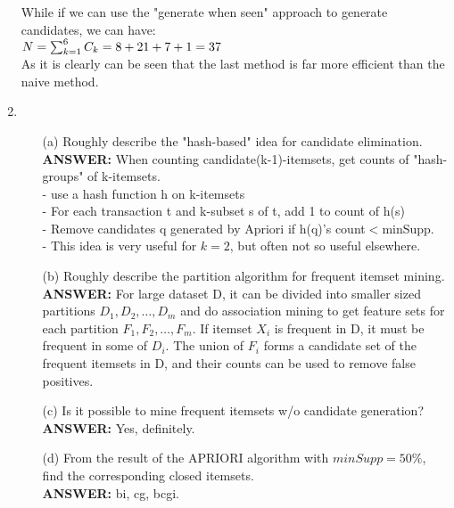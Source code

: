 \documentclass{article}
\begin{document}
\begin{enumerate}
While if we can use the "generate when seen" approach to generate
candidates, we can have: \\
$N = \sum_{k=1}^6C_k \\
= 8 + 21 + 7 + 1 \\
= 37$ \\
As it is clearly can be seen that the last method is far more
efficient than the naive method.

\item 
\begin{enumerate}
\item[(a)] Roughly describe the "hash-based" idea for candidate
  elimination.  \\
\textbf{ANSWER:} When counting candidate(k-1)-itemsets, get counts of
"hash-groups" of k-itemsets.\\
- use a hash function h on k-itemsets \\
- For each transaction t and k-subset s of t, add 1 to count of h(s)
\\
- Remove candidates q generated by Apriori if h(q)'s
count$<$minSupp. \\
- This idea is very useful for $k = 2$, but often not so useful
elsewhere. 

\item[(b)] Roughly describe the partition algorithm for frequent
  itemset mining. \\ 
\textbf{ANSWER:} For large dataset D, it can be divided into smaller
sized partitions $D_1, D_2, \ldots, D_m$ and do association mining to
get feature sets for each partition $F_1, F_2, \ldots, F_m$. If
itemset $X_i$ is frequent in D, it must be frequent in some of $D_i$.
The union of $F_i$ forms a candidate set of the frequent itemsets in
D, and their counts can be used to remove false positives. 

\item[(c)] Is it possible to mine frequent itemsets w/o candidate
  generation? \\
\textbf{ANSWER:} Yes, definitely. 

\item[(d)] From the result of the APRIORI algorithm with
  $minSupp=50\%$, find the corresponding closed itemsets. \\
\textbf{ANSWER:} bi, cg, bcgi. 

\end{enumerate}

\end{enumerate}
\end{document}
